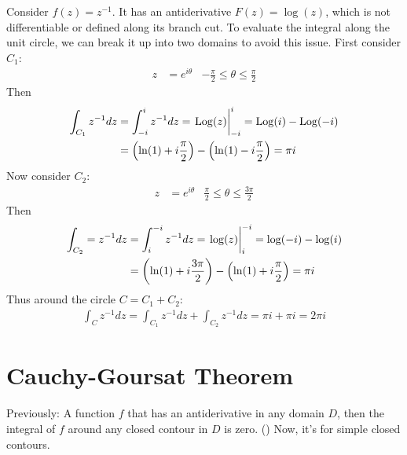 \documentclass[12pt, english]{book}
\begin{document}
	\begin{example}
		Consider \(f(z) = z^{-1}\). It has an antiderivative \(F(z) = \log(z)\), which is not differentiable or defined along its branch cut. To evaluate the integral along the unit circle, we can break it up into two domains to avoid this issue. First consider \(C_1\):
		\begin{align*}
			z &= e^{i\theta} & -\frac{\pi}{2} \leq \theta \leq \frac{\pi}{2}
		\end{align*}
		Then  
		\begin{align*}
			\int_{C_1} z^{-1} dz
			&= \int_{-i}^{i} z^{-1} dz = \eval{\operatorname{Log}(z)}_{-i}^{i} = \operatorname{Log}(i) - \operatorname{Log}(-i) \\
			&= \left(\ln(1) + i\frac{\pi}{2}\right) - \left(\ln(1) - i\frac{\pi}{2}\right) = \pi i
		\end{align*}
		Now consider \(C_2\):
		\begin{align*}
			z &= e^{i\theta} & \frac{\pi}{2} \leq \theta \leq \frac{3\pi}{2}
		\end{align*}
		Then 
		\begin{align*}
			\int_{C_2} = z^{-1} dz 
			&= \int_{i}^{-i} z^{-1} dz = \eval{\log(z)}_{i}^{-i} = \log(-i) - \log(i) \\
			&= \left(\ln(1) + i\frac{3\pi}{2}\right) - \left(\ln(1) + i\frac{\pi}{2}\right) = \pi i
		\end{align*}
		Thus around the circle \(C = C_1 + C_2\):
		\begin{align*}
			\int_{C} z^{-1} dz = \int_{C_1} z^{-1} dz + \int_{C_2} z^{-1} dz = \pi i + \pi i = 2 \pi i
		\end{align*}
	\end{example}
	
	\section{Cauchy-Goursat Theorem} \label{Cauchy-Goursat Theorem Section - Complex}
	
	Previously: A function \(f\) that has an antiderivative in any domain \(D\), then the integral of \(f\) around any closed contour in \(D\) is zero. () Now, it's for simple closed contours. 
	
\end{document}

